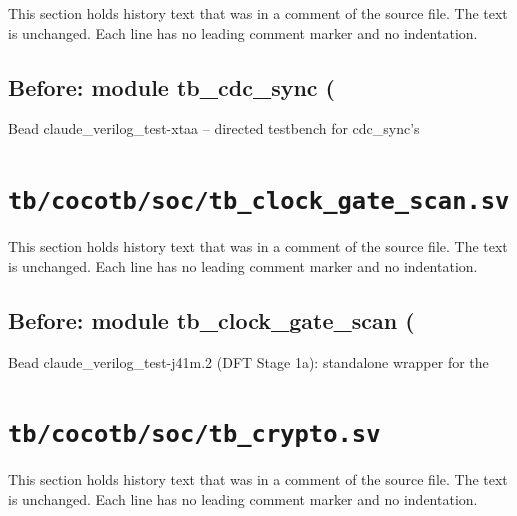 This section holds history text that was in a comment of the source file. The text is unchanged. Each line has no leading comment marker and no indentation.

\begin{record}

\subsection*{Before: module tb\_cdc\_sync (}

\begin{textblock}
Bead claude_verilog_test-xtaa -- directed testbench for cdc_sync's
\end{textblock}

\end{record}

\section{\texttt{tb/cocotb/soc/tb\_clock\_gate\_scan.sv}}\label{cr:suite:soc-tb-clock-gate-scan-sv}

This section holds history text that was in a comment of the source file. The text is unchanged. Each line has no leading comment marker and no indentation.

\begin{record}

\subsection*{Before: module tb\_clock\_gate\_scan (}

\begin{textblock}
Bead claude_verilog_test-j41m.2 (DFT Stage 1a): standalone wrapper for the
\end{textblock}

\end{record}

\section{\texttt{tb/cocotb/soc/tb\_crypto.sv}}\label{cr:suite:soc-tb-crypto-sv}

This section holds history text that was in a comment of the source file. The text is unchanged. Each line has no leading comment marker and no indentation.

